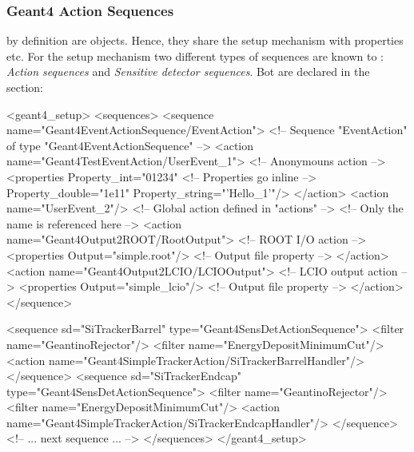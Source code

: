 \documentclass[10pt,a4paper]{article}
\begin{document}
\subsubsection{Geant4 Action Sequences}
\label{sec:ddg4-setup-xml-geant4-sequences}

\noindent
{} by definition are  objects.
Hence, they share the setup mechanism with properties etc. For the setup
mechanism two different types of sequences are known to \DDG:
{\it{Action sequences}} and {\it{Sensitive detector sequences}}. Bot are declared in
the  section:
\begin{code}
<geant4_setup>
  <sequences>
    <sequence name="Geant4EventActionSequence/EventAction"> <!-- Sequence "EventAction" of type
                                                                 "Geant4EventActionSequence" -->
      <action name="Geant4TestEventAction/UserEvent_1">     <!-- Anonymouns action                   -->
        <properties Property_int="01234"                    <!-- Properties go inline               -->
            Property_double="1e11"
            Property_string="'Hello_1'"/>
      </action>
      <action name="UserEvent_2"/>                          <!-- Global action defined in "actions" -->
                                                            <!-- Only the name is referenced here   -->
      <action name="Geant4Output2ROOT/RootOutput">          <!-- ROOT I/O action                    -->
        <properties Output="simple.root"/>                  <!-- Output file property               -->
      </action>
      <action name="Geant4Output2LCIO/LCIOOutput">          <!-- LCIO output action                 -->
        <properties Output="simple_lcio"/>                  <!-- Output file property               -->
      </action>
    </sequence>


    <sequence sd="SiTrackerBarrel" type="Geant4SensDetActionSequence">
      <filter name="GeantinoRejector"/>
      <filter name="EnergyDepositMinimumCut"/>
      <action name="Geant4SimpleTrackerAction/SiTrackerBarrelHandler"/>
    </sequence>
    <sequence sd="SiTrackerEndcap" type="Geant4SensDetActionSequence">
      <filter name="GeantinoRejector"/>
      <filter name="EnergyDepositMinimumCut"/>
      <action name="Geant4SimpleTrackerAction/SiTrackerEndcapHandler"/>
    </sequence>
    <!--    ... next sequence ...     -->
  </sequences>
</geant4_setup>
\end{code}
\end{document}
